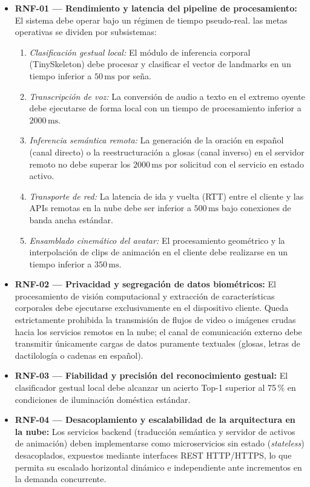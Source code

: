 \begin{itemize}
    \item \textbf{RNF-01 --- Rendimiento y latencia del pipeline de procesamiento:} 
    El sistema debe operar bajo un régimen de tiempo pseudo-real. las metas operativas se dividen por subsistemas:
    \begin{enumerate}
        \item \textit{Clasificación gestual local:} El módulo de inferencia corporal (TinySkeleton) debe procesar y clasificar el vector de landmarks en un tiempo inferior a $50\,\text{ms}$ por seña.
        \item \textit{Transcripción de voz:} La conversión de audio a texto en el extremo oyente debe ejecutarse de forma local con un tiempo de procesamiento inferior a $2000\,\text{ms}$.
        \item \textit{Inferencia semántica remota:} La generación de la oración en español (canal directo) o la reestructuración a glosas (canal inverso) en el servidor remoto no debe superar los $2000\,\text{ms}$ por solicitud con el servicio en estado activo.
        \item \textit{Transporte de red:} La latencia de ida y vuelta (RTT) entre el cliente y las APIs remotas en la nube debe ser inferior a $500\,\text{ms}$ bajo conexiones de banda ancha estándar.
        \item \textit{Ensamblado cinemático del avatar:} El procesamiento geométrico y la interpolación de clips de animación en el cliente debe realizarse en un tiempo inferior a $350\,\text{ms}$.
    \end{enumerate}

    \item \textbf{RNF-02 --- Privacidad y segregación de datos biométricos:} 
    El procesamiento de visión computacional y extracción de características corporales debe ejecutarse exclusivamente en el dispositivo cliente. Queda estrictamente prohibida la transmisión de flujos de video o imágenes crudas hacia los servicios remotos en la nube; el canal de comunicación externo debe transmitir únicamente cargas de datos puramente textuales (glosas, letras de dactilología o cadenas en español).

    \item \textbf{RNF-03 --- Fiabilidad y precisión del reconocimiento gestual:} 
    El clasificador gestual local debe alcanzar un acierto Top-1 superior al 75\,\% en condiciones de iluminación doméstica estándar.

    \item \textbf{RNF-04 --- Desacoplamiento y escalabilidad de la arquitectura en la nube:} 
    Los servicios backend (traducción semántica y servidor de activos de animación) deben implementarse como microservicios sin estado (\textit{stateless}) desacoplados, expuestos mediante interfaces REST HTTP/HTTPS, lo que permita su escalado horizontal dinámico e independiente ante incrementos en la demanda concurrente.


\end{itemize}
